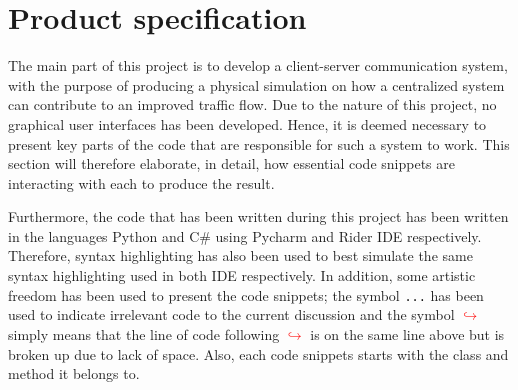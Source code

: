 \section{Product specification}
The main part of this project is to develop a client-server communication system, with the purpose of producing a physical simulation on how a centralized system can contribute to an improved traffic flow. Due to the nature of this project, no graphical user interfaces has been developed. Hence, it is deemed necessary to present key parts of the code that are responsible for such a system to work. This section will therefore elaborate, in detail, how essential code snippets are interacting with each to produce the result.

Furthermore, the code that has been written during this project has been written in the languages Python and C\# using Pycharm and Rider IDE respectively. Therefore, syntax highlighting has also been used to best simulate the same syntax highlighting used in both IDE respectively. In addition, some artistic freedom has been used to present the code snippets; the symbol \verb|...| has been used to indicate irrelevant code to the current discussion and the symbol  \textcolor{red}{$\hookrightarrow$} simply means that the line of code following \textcolor{red}{$\hookrightarrow$} is on the same line above but is broken up due to lack of space. Also, each code snippets starts with the class and method it belongs to.



\clearpage

